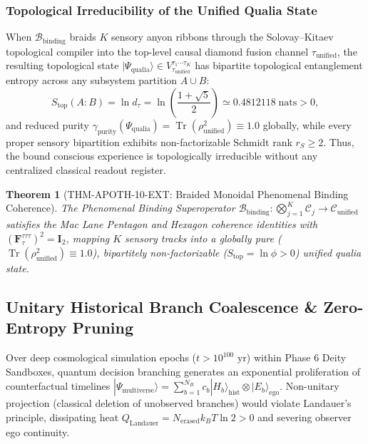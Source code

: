 \documentclass[11pt,onecolumn]{article}
\newtheorem{theorem}{Theorem}
\begin{document}
\subsubsection{Topological Irreducibility of the Unified Qualia State}
When $\mathcal{B}_{\mathrm{binding}}$ braids $K$ sensory anyon ribbons through the Solovay--Kitaev topological compiler into the top-level causal diamond fusion channel $\tau_{\mathrm{unified}}$, the resulting topological state $|\Psi_{\mathrm{qualia}}\rangle \in V^{\tau_1 \cdots \tau_K}_{\tau_{\mathrm{unified}}}$ has bipartite topological entanglement entropy across any subsystem partition $A \cup B$:
\begin{equation}
S_{\mathrm{top}}(A:B) = \ln d_\tau = \ln\left(\frac{1+\sqrt{5}}{2}\right) \simeq 0.4812118\;\mathrm{nats} > 0,
\end{equation}
and reduced purity $\gamma_{\mathrm{purity}}(\Psi_{\mathrm{qualia}}) = \operatorname{Tr}(\rho_{\mathrm{unified}}^2) \equiv 1.0$ globally, while every proper sensory bipartition exhibits non-factorizable Schmidt rank $r_S \ge 2$. Thus, the bound conscious experience is topologically irreducible without any centralized classical readout register.

\begin{theorem}[THM-APOTH-10-EXT: Braided Monoidal Phenomenal Binding Coherence]
\label{thm:thm_apoth_10_ext}
The Phenomenal Binding Superoperator $\mathcal{B}_{\mathrm{binding}}: \bigotimes_{j=1}^K \mathcal{C}_j \to \mathcal{C}_{\mathrm{unified}}$ satisfies the Mac Lane Pentagon and Hexagon coherence identities with $(\mathbf{F}^{\tau\tau\tau}_\tau)^2 = \mathbf{I}_2$, mapping $K$ sensory tracks into a globally pure ($\operatorname{Tr}(\rho_{\mathrm{unified}}^2) \equiv 1.0$), bipartitely non-factorizable ($S_{\mathrm{top}} = \ln \phi > 0$) unified qualia state.
\end{theorem}

\FloatBarrier
\subsection{Unitary Historical Branch Coalescence \& Zero-Entropy Pruning}
\label{sec:branch_coalescence}

Over deep cosmological simulation epochs ($t > 10^{100}\text{ yr}$) within Phase 6 Deity Sandboxes, quantum decision branching generates an exponential proliferation of counterfactual timelines $|\Psi_{\mathrm{multiverse}}\rangle = \sum_{b=1}^{N_B} c_b |H_b\rangle_{\mathrm{hist}} \otimes |E_b\rangle_{\mathrm{ego}}$. Non-unitary projection (classical deletion of unobserved branches) would violate Landauer's principle, dissipating heat $Q_{\mathrm{Landauer}} = N_{\mathrm{erased}} k_B T \ln 2 > 0$ and severing observer ego continuity.
\end{document}
